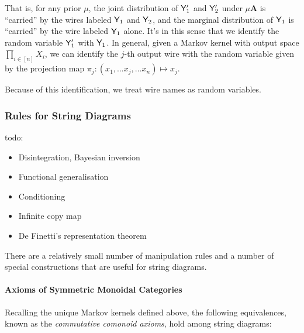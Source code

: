 \begin{example}
That is, for any prior $\mu$, the joint distribution of $\mathsf{Y}'_1$ and $\mathsf{Y}'_2$ under $\mu\mathbf{A}$ is ``carried'' by the wires labeled $\mathsf{Y}_1$ and $\mathsf{Y}_2$, and the marginal distribution of $\mathsf{Y}_1$ is ``carried'' by the wire labeled $\mathsf{Y}_1$ alone. It's in this sense that we identify the random variable $\mathsf{Y}'_1$ with $\mathsf{Y}_1$. In general, given a Markov kernel with output space $\prod_{i\in [n]} X_i$, we can identify the $j$-th output wire with the random variable given by the projection map $\pi_j:(x_1,...x_j,...x_n)\mapsto x_j$.

Because of this identification, we treat wire names as random variables.
\end{example}

\subsubsection{Rules for String Diagrams}

todo:
\begin{itemize}
\item Disintegration, Bayesian inversion
\item Functional generalisation
\item Conditioning
\item Infinite copy map
\item De Finetti's representation theorem
\end{itemize}

There are a relatively small number of manipulation rules and a number of special constructions that are useful for string diagrams.

\paragraph{Axioms of Symmetric Monoidal Categories}

Recalling the unique Markov kernels defined above, the following equivalences, known as the \emph{commutative comonoid axioms}, hold among string diagrams:

